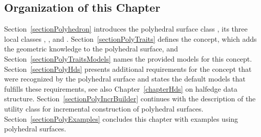 \subsection*{Organization of this Chapter}

Section~\ref{sectionPolyhedron} introduces the polyhedral surface
class , its three local classes ,
, and . Section~\ref{sectionPolyTraits}
defines the  concept, which adds the geometric
knowledge to the polyhedral surface, and
Section~\ref{sectionPolyTraitsModels} names the provided models for
this concept.  Section~\ref{sectionPolyHds} presents additional
requirements for the  concept that were
recognized by the polyhedral surface and states the default models
that fulfills these requirements, see also Chapter~\ref{chapterHds} on
halfedge data structure. Section~\ref{sectionPolyIncrBuilder}
continues with the description of the utility class for incremental
construction of polyhedral surfaces.
Section~\ref{sectionPolyExamples} concludes this chapter with examples
using polyhedral surfaces.

